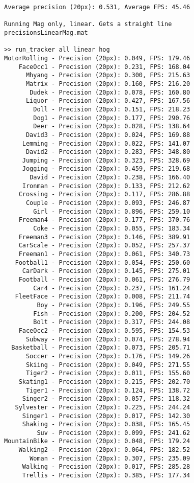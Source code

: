 \begin{lstlisting}
Average precision (20px): 0.531, Average FPS: 45.46

Running Mag only, linear. Gets a straight line
precisionsLinearMag.mat

>> run_tracker all linear hog
MotorRolling - Precision (20px): 0.049, FPS: 179.46
    FaceOcc1 - Precision (20px): 0.231, FPS: 168.04
      Mhyang - Precision (20px): 0.300, FPS: 215.63
      Matrix - Precision (20px): 0.160, FPS: 216.20
       Dudek - Precision (20px): 0.078, FPS: 160.80
      Liquor - Precision (20px): 0.427, FPS: 167.56
        Doll - Precision (20px): 0.151, FPS: 218.23
        Dog1 - Precision (20px): 0.177, FPS: 290.76
        Deer - Precision (20px): 0.028, FPS: 138.64
      David3 - Precision (20px): 0.024, FPS: 169.88
     Lemming - Precision (20px): 0.022, FPS: 141.07
      David2 - Precision (20px): 0.283, FPS: 348.80
     Jumping - Precision (20px): 0.323, FPS: 328.69
     Jogging - Precision (20px): 0.459, FPS: 219.68
       David - Precision (20px): 0.238, FPS: 166.40
     Ironman - Precision (20px): 0.133, FPS: 212.62
    Crossing - Precision (20px): 0.117, FPS: 286.88
      Couple - Precision (20px): 0.093, FPS: 246.87
        Girl - Precision (20px): 0.896, FPS: 259.10
    Freeman4 - Precision (20px): 0.177, FPS: 370.76
        Coke - Precision (20px): 0.055, FPS: 183.34
    Freeman3 - Precision (20px): 0.146, FPS: 389.91
    CarScale - Precision (20px): 0.052, FPS: 257.37
    Freeman1 - Precision (20px): 0.061, FPS: 340.73
   Football1 - Precision (20px): 0.054, FPS: 250.60
     CarDark - Precision (20px): 0.145, FPS: 275.01
    Football - Precision (20px): 0.061, FPS: 276.79
        Car4 - Precision (20px): 0.237, FPS: 161.24
   FleetFace - Precision (20px): 0.008, FPS: 211.74
         Boy - Precision (20px): 0.196, FPS: 249.55
        Fish - Precision (20px): 0.200, FPS: 204.52
        Bolt - Precision (20px): 0.317, FPS: 244.08
    FaceOcc2 - Precision (20px): 0.595, FPS: 154.53
      Subway - Precision (20px): 0.074, FPS: 278.94
  Basketball - Precision (20px): 0.073, FPS: 205.71
      Soccer - Precision (20px): 0.176, FPS: 149.26
      Skiing - Precision (20px): 0.049, FPS: 271.55
      Tiger2 - Precision (20px): 0.011, FPS: 155.60
    Skating1 - Precision (20px): 0.215, FPS: 202.70
      Tiger1 - Precision (20px): 0.124, FPS: 138.72
     Singer2 - Precision (20px): 0.057, FPS: 118.32
   Sylvester - Precision (20px): 0.225, FPS: 244.24
     Singer1 - Precision (20px): 0.017, FPS: 142.30
     Shaking - Precision (20px): 0.038, FPS: 165.45
         Suv - Precision (20px): 0.099, FPS: 241.62
MountainBike - Precision (20px): 0.048, FPS: 179.24
    Walking2 - Precision (20px): 0.064, FPS: 182.52
       Woman - Precision (20px): 0.307, FPS: 235.09
     Walking - Precision (20px): 0.017, FPS: 285.28
     Trellis - Precision (20px): 0.385, FPS: 177.34


\end{lstlisting}
